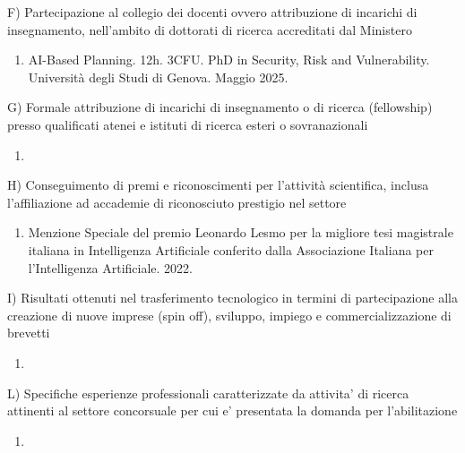 \documentclass{resume} %
\begin{document}
\begin{rSectionLower}{F) Partecipazione al collegio dei docenti ovvero attribuzione di incarichi di insegnamento, nell'ambito di dottorati di ricerca accreditati dal Ministero}
	\begin{enumerate}
		\item AI-Based Planning. 12h. 3CFU. PhD in Security, Risk and Vulnerability. Università degli Studi di Genova. Maggio 2025.
	\end{enumerate}
\end{rSectionLower}

\begin{rSectionLower}{G) Formale attribuzione di incarichi di insegnamento o di ricerca (fellowship) presso qualificati atenei e istituti di ricerca esteri o sovranazionali}
	\begin{enumerate}
		\item 
	\end{enumerate}
\end{rSectionLower}

\begin{rSectionLower}{H) Conseguimento di premi e riconoscimenti per l'attività scientifica, inclusa l’affiliazione ad accademie di riconosciuto prestigio nel settore}
	\begin{enumerate}
		\item Menzione Speciale del premio Leonardo Lesmo per la migliore tesi magistrale italiana in Intelligenza Artificiale conferito dalla Associazione Italiana per l'Intelligenza Artificiale. 2022.
	\end{enumerate}
\end{rSectionLower}

\begin{rSectionLower}{I) Risultati ottenuti nel trasferimento tecnologico in termini di partecipazione alla creazione di nuove imprese (spin off), sviluppo, impiego e commercializzazione di brevetti}
	\begin{enumerate}
		\item 
	\end{enumerate}
\end{rSectionLower}

\begin{rSectionLower}{L) Specifiche esperienze professionali caratterizzate da attivita' di ricerca attinenti al settore concorsuale per cui e' presentata la domanda per l'abilitazione
}
	\begin{enumerate}
		\item 
	\end{enumerate}
\end{rSectionLower}
\end{document}
